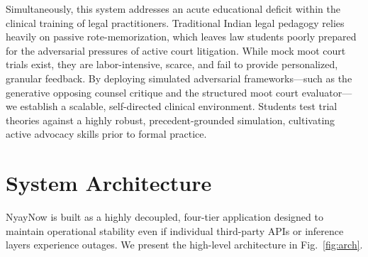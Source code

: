 \documentclass[conference]{IEEEtran}
\begin{document}
Simultaneously, this system addresses an acute educational deficit within the clinical training of legal practitioners. Traditional Indian legal pedagogy relies heavily on passive rote-memorization, which leaves law students poorly prepared for the adversarial pressures of active court litigation. While mock moot court trials exist, they are labor-intensive, scarce, and fail to provide personalized, granular feedback. By deploying simulated adversarial frameworks—such as the generative opposing counsel critique and the structured moot court evaluator—we establish a scalable, self-directed clinical environment. Students test trial theories against a highly robust, precedent-grounded simulation, cultivating active advocacy skills prior to formal practice.

\section{System Architecture}
\label{sec:arch}

NyayNow is built as a highly decoupled, four-tier application designed to maintain operational stability even if individual third-party APIs or inference layers experience outages. We present the high-level architecture in Fig.~\ref{fig:arch}.
\end{document}
